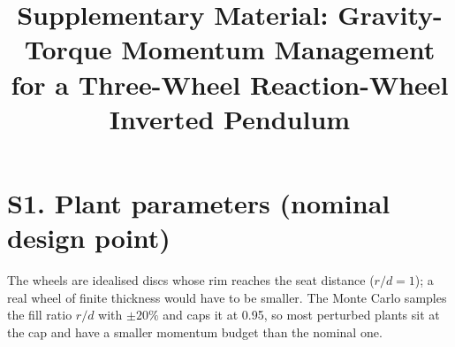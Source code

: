 \documentclass[conference]{IEEEtran}
\begin{document}
\title{Supplementary Material: Gravity-Torque Momentum Management for a Three-Wheel Reaction-Wheel Inverted Pendulum}
\author{}
\maketitle
\section*{S1. Plant parameters (nominal design point)}
\begin{table}[h]\centering\footnotesize\end{table}
The wheels are idealised discs whose rim reaches the seat distance ($r/d=1$); a real wheel of finite thickness would have to be smaller. The Monte Carlo samples the fill ratio $r/d$ with $\pm20\%$ and caps it at 0.95, so most perturbed plants sit at the cap and have a smaller momentum budget than the nominal one.
\end{document}
